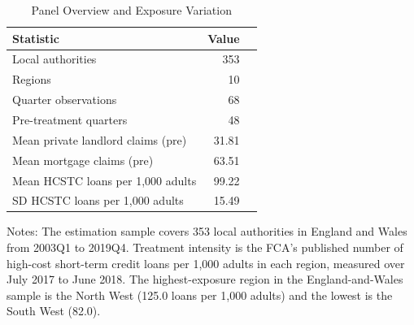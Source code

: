 \begin{table}[H]
\centering
\caption{Panel Overview and Exposure Variation}
\begin{threeparttable}
\begin{tabular}{lrr}
\toprule
Statistic & Value \\
\midrule
Local authorities & 353 \\
Regions & 10 \\
Quarter observations & 68 \\
Pre-treatment quarters & 48 \\
Mean private landlord claims (pre) & 31.81 \\
Mean mortgage claims (pre) & 63.51 \\
Mean HCSTC loans per 1,000 adults & 99.22 \\
SD HCSTC loans per 1,000 adults & 15.49 \\
\bottomrule
\end{tabular}
\begin{flushleft}
\small Notes: The estimation sample covers 353 local authorities in England and Wales from 2003Q1 to 2019Q4. Treatment intensity is the FCA's published number of high-cost short-term credit loans per 1,000 adults in each region, measured over July 2017 to June 2018. The highest-exposure region in the England-and-Wales sample is the North West (125.0 loans per 1,000 adults) and the lowest is the South West (82.0).
\end{flushleft}
\end{threeparttable}
\label{tab:summary}
\end{table}
